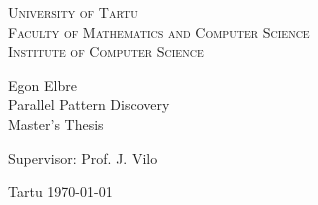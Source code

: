 \begin{titlepage}
\begin{center}

{\scshape
    University of Tartu                  \\[2mm]
    Faculty of Mathematics and Computer Science   \\[3mm]
    Institute of Computer Science
}

  {\Large Egon Elbre } \\[5mm]
  {\Huge  Parallel Pattern Discovery } \\[5mm]
  {\large Master's Thesis}

\begin{flushright}
    {\Large Supervisor: Prof. J. Vilo }
\end{flushright}


{\large Tartu \today}

\end{center}
\end{titlepage}
